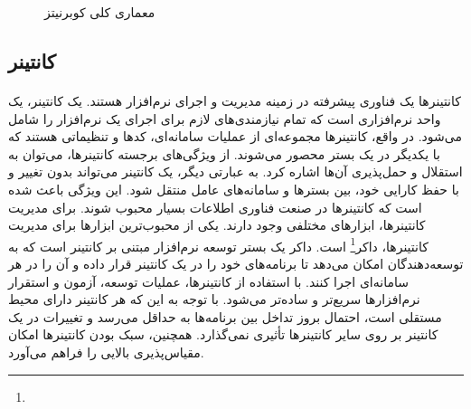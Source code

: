 {\begin{enumerate}
    \end{enumerate}
    \begin{figure}[H]
        \caption{معماری کلی کوبرنیتز}
        \label{fig:kube_compontents}
    \end{figure}
}

\subsection{کانتینر‌}
\label{subsec:containers}
\paragraph{}
{
    کانتینرها یک فناوری پیشرفته در زمینه مدیریت و اجرای نرم‌افزار هستند. یک کانتینر، یک واحد نرم‌افزاری است که تمام نیازمندی‌های
    لازم برای اجرای یک نرم‌افزار را شامل می‌شود. در واقع، کانتینرها مجموعه‌ای از عملیات سامانه‌ای، کدها و تنظیماتی هستند که با 
    یکدیگر در یک بستر محصور می‌شوند. از ویژگی‌های برجسته کانتینرها، می‌توان به استقلال و حمل‌پذیری آن‌ها اشاره کرد. به عبارتی دیگر،
    یک کانتینر می‌تواند بدون تغییر و با حفظ کارایی خود، بین بستر‌ها و سامانه‌‌های عامل‌ منتقل شود. این ویژگی باعث شده است که کانتینرها
    در صنعت فناوری اطلاعات بسیار محبوب شوند. برای مدیریت کانتینرها، ابزارهای مختلفی وجود دارند. یکی از محبوب‌ترین ابزارها برای مدیریت کانتینرها،
    داکر\footnote{}
    است. داکر یک بستر توسعه نرم‌افزار مبتنی بر کانتینر است که به توسعه‌دهندگان امکان می‌دهد تا برنامه‌های خود را در یک کانتینر قرار داده و آن را در
    هر سامانه‌ای اجرا کنند. با استفاده از کانتینرها، عملیات توسعه، آزمون و استقرار نرم‌افزارها سریع‌تر و ساده‌تر می‌شود. با توجه به این که هر کانتینر
    دارای محیط مستقلی است، احتمال بروز تداخل بین برنامه‌ها به حداقل می‌رسد و تغییرات در یک کانتینر بر روی سایر کانتینرها تأثیری نمی‌گذارد. همچنین،
    سبک بودن کانتینرها امکان مقیاس‌پذیری بالایی را فراهم می‌آورد.
}

